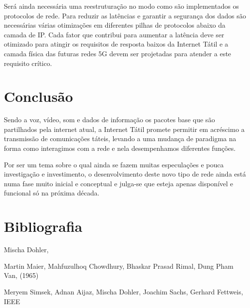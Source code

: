 \documentclass{llncs}
\begin{document}
Será ainda necessária uma reestruturação no modo como são implementados os protocolos de rede. Para reduzir as latências e garantir a segurança dos dados são necessárias várias otimizações em diferentes pilhas de protocolos abaixo da camada de IP. Cada fator que contribui para aumentar a latência deve ser otimizado para atingir os requisitos de resposta baixos da Internet Tátil e a camada física das futuras redes 5G devem ser projetadas para atender a este requisito crítico. 

\section{Conclusão}
\setlength{\parindent}{0.5cm}
Sendo a voz, vídeo, som e dados de informação os pacotes base que são partilhados pela internet atual, a Internet Tátil promete permitir em acréscimo a transmissão  de  comunicações  táteis,  levando  a  uma  mudança  de  paradigma  na  forma como interagimos com a rede e nela desempenhamos diferentes funções.

Por ser um tema sobre o qual ainda se fazem muitas especulações e pouca investigação e investimento, o desenvolvimento deste novo tipo de rede ainda está numa fase muito inicial e conceptual e julga-se que esteja apenas disponível e funcional só na próxima década.

\section{Bibliografia}



\begin{thebibliography}{1}
Mischa Dohler,

Martin Maier, Mahfuzulhoq Chowdhury, Bhaskar Prasad Rimal, Dung Pham Van,
 (1965)

Meryem Simsek, Adnan Aijaz, Mischa Dohler, Joachim Sachs, Gerhard Fettweis, IEEE

\end{thebibliography}
\end{document}
